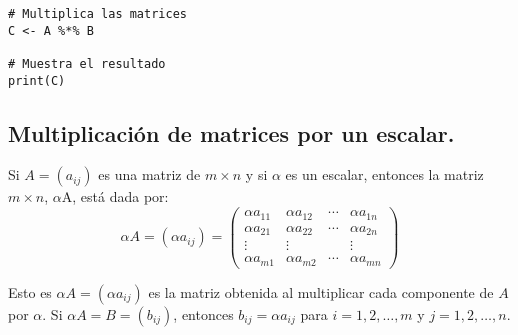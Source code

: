 \begin{}
\begin{verbatim}
# Multiplica las matrices
C <- A %*% B

# Muestra el resultado
print(C)    
\end{verbatim}
\subsection{Multiplicación de matrices por un escalar.}
\begin{definition}
Si $A=(a_{ij})$ es una matriz de $m\times n$ y si $\alpha$ es un escalar, entonces la matriz $m\times n$, $\alpha$A, 
está dada por:\\
$$
\alpha A=\left(\alpha a_{i j}\right)=\left(\begin{array}{cccc}
\alpha a_{11} & \alpha a_{12} & \cdots & \alpha a_{1 n} \\
\alpha a_{21} & \alpha a_{22} & \cdots & \alpha a_{2 n} \\
\vdots & \vdots & & \vdots \\
\alpha a_{m 1} & \alpha a_{m 2} & \cdots & \alpha a_{m n}
\end{array}\right)
$$

Esto es $\alpha A=\left(\alpha a_{i j}\right)$ es la matriz obtenida al multiplicar cada componente de $A$ por $\alpha$. Si $\alpha A=B=\left(b_{i j}\right)$, entonces $b_{i j}=\alpha a_{i j}$ para $i=1,2, \ldots, m$ y $j=1,2, \ldots, n$.
\end{definition}


\end{}
